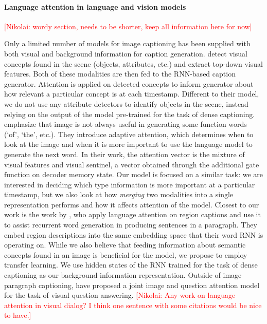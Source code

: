 \documentclass[11pt,a4paper]{article}
\newcommand{\kibitz}[2]{\ifnum\Comments=1\textcolor{#1}{#2}\fi}
\newcommand{\nikolai}[1]{\kibitz{red}      {[Nikolai: #1]}}
\begin{document}
\paragraph{Language attention in language and vision models}
\nikolai{wordy section, needs to be shorter, keep all information here for now}

Only a limited number of models for image captioning has been supplied with both visual and background information for caption generation.
 detect visual concepts found in the scene (objects, attributes, etc.) and extract top-down visual features.
Both of these modalities are then fed to the RNN-based caption generator.
Attention is applied on detected concepts to inform generator about how relevant a particular concept is at each timestamp. Different to their model, we do not use any attribute detectors to identify objects in the scene, instead relying on the output of the model pre-trained for the task of dense captioning.
 emphasize that image is not always useful in generating some function words (`of', `the', etc.).
They introduce adaptive attention, which determines when to look at the image and when it is more important to use the language model to generate the next word.
In their work, the attention vector is the mixture of visual features and visual sentinel, a vector obtained through the additional gate function on decoder memory state.
Our model is focused on a similar task: we are interested in deciding which type information is more important at a particular timestamp, but we also look at how \textit{merging} two modalities into a single representation performs and how it affects attention of the model.
Closest to our work is the work by \cite{liang2017recurrent}, who apply language attention on region captions and use it to assist recurrent word generation in producing sentences in a paragraph. They embed region descriptions into the same embedding space that their word RNN is operating on. While we also believe that feeding information about semantic concepts found in an image is beneficial for the model, we propose to employ transfer learning. We use hidden states of the RNN trained for the task of dense captioning \cite{densecap} as our background information representation.
Outside of image paragraph captioning,  have proposed a joint image and question attention model for the task of visual question answering.
\nikolai{Any work on language attention in visual dialog? I think one sentence with some citations would be nice to have.}
\end{document}
